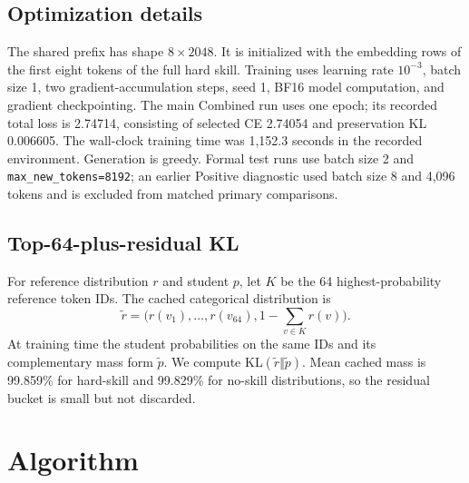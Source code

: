 \subsection{Optimization details}
The shared prefix has shape $8\times 2048$.  It is initialized with the embedding rows of the first eight tokens of the full hard skill.  Training uses learning rate $10^{-3}$, batch size 1, two gradient-accumulation steps, seed 1, BF16 model computation, and gradient checkpointing.  The main Combined run uses one epoch; its recorded total loss is 2.74714, consisting of selected CE 2.74054 and preservation KL 0.006605.  The wall-clock training time was 1,152.3 seconds in the recorded environment.  Generation is greedy.  Formal test runs use batch size 2 and \texttt{max\_new\_tokens=8192}; an earlier Positive diagnostic used batch size 8 and 4,096 tokens and is excluded from matched primary comparisons.

\subsection{Top-64-plus-residual KL}
For reference distribution $r$ and student $p$, let $K$ be the 64 highest-probability reference token IDs.  The cached categorical distribution is
\begin{equation}
\tilde r = \big(r(v_1),\ldots,r(v_{64}),1-\sum_{v\in K}r(v)\big).
\end{equation}
At training time the student probabilities on the same IDs and its complementary mass form $\tilde p$.  We compute $\mathrm{KL}(\tilde r\Vert\tilde p)$.  Mean cached mass is 99.859\% for hard-skill and 99.829\% for no-skill distributions, so the residual bucket is small but not discarded.

\section{Algorithm}
\label{app:algorithm}


